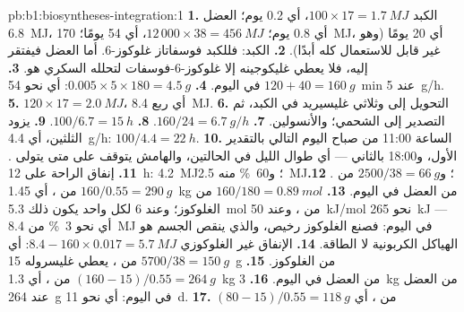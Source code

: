 \begin{solution}{pb:b1:biosyntheses-integration:1}
\textbf{1.}  الكبد $100\times 17 = \qty{1.7}{MJ}$، أي 0.2
يوم؛  العضل \qty{6.8}{MJ}، أي 0.8 يوم؛ 
$12\,000\times 38 =
\qty{456}{MJ}$، أي 54 يومًا؛ 
\qty{170}{MJ}، أي 20 يومًا (وهو غير قابل للاستعمال كله أبدًا).
\textbf{2.}  الكبد: فللكبد فوسفاتاز غلوكوز-6. أما العضل
فيفتقر إليه، فلا يعطي غليكوجينه إلا غلوكوز-6-فوسفات لتحلله السكري
هو.
\textbf{3.} $120 + 40 = \qty{160}{g}$ في اليوم.
\textbf{4.} $0.005\times 5\times 180 = \qty{4.5}{g}$: أي نحو \qty{54}{min} عند \qty{5}{g/h}.
\textbf{5.} $120\times 17 = \qty{2.0}{MJ}$، أي ربع \qty{8.4}{MJ}.
\textbf{6.} التحويل إلى  وثلاثي غليسيريد في الكبد، ثم
التصدير إلى  الشحمي؛ والأنسولين.
\textbf{7.} $160/24 = \qty{6.7}{g/h}$.
\textbf{8.} $100/6.7 = \qty{15}{h}$.
\textbf{9.}  يزود الثلثين، أي \qty{4.4}{g/h}:
$100/4.4 =
\qty{22}{h}$.
\textbf{10.} الساعة 11:00 من صباح اليوم التالي بالتقدير الأول،
و18:00 بالثاني --- أي طوال الليل في الحالتين، والهامش يتوقف على متى
يتولى .
\textbf{11.} إنفاق الراحة على \qty{12}{h}: \qty{4.2}{MJ}؛
و\qty{60}{\%} منه \qty{2.5}{MJ}؛ و$2500/38 = \qty{66}{g}$ من .
\textbf{12.} $160/0.55 = \qty{290}{g}$ من ، أي \qty{1.45}{kg}
من العضل في اليوم.
\textbf{13.} $160/180 = \qty{0.89}{mol}$ من الغلوكوز؛ وعند 6 
لكل واحد يكون ذلك \qty{5.3}{mol} من ، وعند \qty{50}{kJ/mol}
نحو \qty{265}{kJ} --- أي نحو \qty{3}{\%} من \qty{8.4}{MJ} في اليوم: فصنع
الغلوكوز رخيص، والذي ينقص الجسم هو الهياكل الكربونية لا الطاقة.
\textbf{14.} الإنفاق غير الغلوكوزي $8.4 - 160\times 0.017 =
\qty{5.7}{MJ}$: أي $5700/38 = \qty{150}{g}$ من ، يعطي غليسروله
\qty{15}{g} من الغلوكوز.
\textbf{15.} $(160 - 15)/0.55 = \qty{264}{g}$ من ، أي
\qty{1.3}{kg} من العضل في اليوم.
\textbf{16.} \qty{3}{kg} من  العضل عند \qty{264}{g} في اليوم:
أي نحو \qty{11}{d}.
\textbf{17.} $(80 - 15)/0.55 = \qty{118}{g}$ من ، أي

\end{solution}
